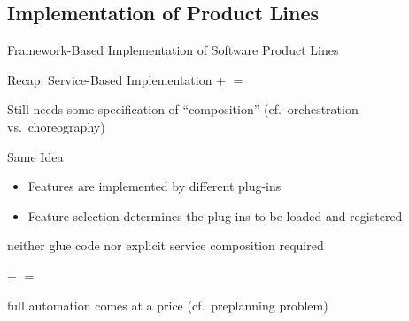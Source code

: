 \subsection{Implementation of Product Lines}
\begin{frame}{Framework-Based Implementation of Software Product Lines}
	\begin{mycolumns}[widths={40},animation=none]
		\begin{example}{Recap: Service-Based Implementation}
				\vspace*{\fill}
					$+$ 
				\vspace*{\fill}	
				\vspace*{\fill}
					$=$ 
				\vspace*{\fill}	
		\end{example}
		\begin{example}{Still needs some specification of ``composition'' (cf.\ orchestration vs.\ choreography)}
			\centering
		\end{example}
	\mynextcolumn		
		\pause
		\begin{definition}{Same Idea}
			\begin{itemize}
				\item Features are implemented by different plug-ins
				\item Feature selection determines the plug-ins to be loaded and registered 
			\end{itemize}
		\end{definition}
		\pause
		\begin{note}{}
				neither glue code nor explicit service composition required
		\end{note}
		\begin{example}{}
				\vspace*{\fill}
					$+$ 
				\vspace*{\fill}	
				\vspace*{\fill}
					$=$ 
				\vspace*{\fill}	
		\end{example}
		\pause
		\begin{note}{}
				full automation comes at a price (cf.\ preplanning problem)
		\end{note}		
	\end{mycolumns}	
\end{frame}

